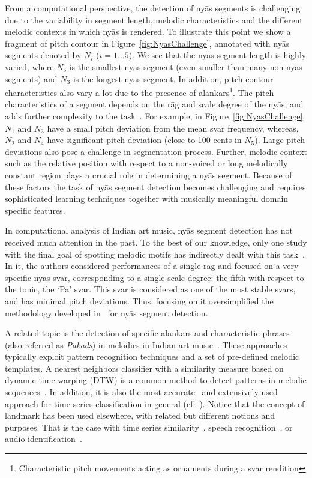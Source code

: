 {{From a computational perspective, the detection of ny\={a}s segments is challenging due to the variability in segment length, melodic characteristics and the different melodic contexts in which ny\={a}s is rendered. To illustrate this point we show a fragment of pitch contour in Figure~\ref{fig:NyasChallenge}, annotated with ny\={a}s segments denoted by $N_i$ ($i={1...5}$). We see that the ny\={a}s segment length is highly varied, where $N_5$ is the smallest ny\={a}s segment (even smaller than many non-ny\={a}s segments) and $N_3$ is the longest ny\={a}s segment. In addition, pitch contour characteristics also vary a lot due to the presence of alank\={a}rs\footnote{Characteristic pitch movements acting as ornaments during a svar rendition}. The pitch characteristics of a segment depends on the r\={a}g and scale degree of the ny\={a}s, and adds further complexity to the task~\cite{Bagchee1998}. For example, in Figure~\ref{fig:NyasChallenge}, $N_1$ and $N_3$ have a small pitch deviation from the mean svar frequency, whereas, $N_2$ and $N_4$ have significant pitch deviation (close to 100 cents in $N_5$). Large pitch deviations also pose a challenge in segmentation process. Further, melodic context such as the relative position with respect to a non-voiced or long melodically constant region plays a crucial role in determining a ny\={a}s segment. Because of these factors the task of ny\={a}s segment detection becomes challenging and requires sophisticated learning techniques together with musically meaningful domain specific features.


In computational analysis of Indian art music, ny\={a}s segment detection has not received much attention in the past. To the best of our knowledge, only one study with the final goal of spotting melodic motifs has indirectly dealt with this task~\cite{Ross2012}. In it, the authors considered performances of a single r\={a}g and focused on a very specific ny\={a}s svar, corresponding to a single scale degree: the fifth with respect to the tonic, the `Pa' svar. This svar is considered as one of the most stable svars, and has minimal pitch deviations. Thus, focusing on it oversimplified the methodology developed in~\cite{Ross2012} for ny\={a}s segment detection.

A related topic is the detection of specific alank\={a}rs and characteristic phrases (also referred as {\it Pakads}) in melodies in Indian art music~\cite{Datta2007, Pratyush2010, Ross2012b, Ishwar2013}. These approaches typically exploit pattern recognition techniques and a set of pre-defined melodic templates. A nearest neighbors classifier with a similarity measure based on dynamic time warping (DTW) is a common method to detect patterns in melodic sequences~\cite{Pratyush2010, Ross2012b}. In addition, it is also the most accurate~\cite{Xi06ICML} and extensively used approach for time series classification in general (cf.~\cite{Wang12DMKD}). Notice that the concept of landmark has been used elsewhere, with related but different notions and purposes. That is the case with time series similarity~\cite{Perng00ICDE}, speech recognition~\cite{Jansen08JASA,Chen12ICASSP}, or audio identification~\cite{Duong13ICASSP}.

}}
